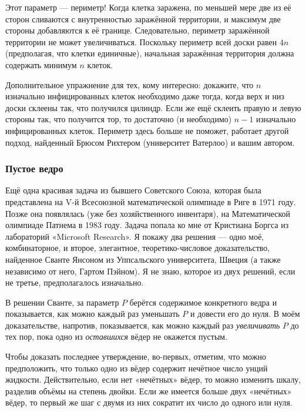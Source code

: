 Этот параметр --- периметр!
Когда клетка заражена, по меньшей мере две из её сторон сливаются с внутренностью заражённой территории, и максимум две стороны добавляются к её границе.
Следовательно, периметр заражённой территории не может увеличиваться.
Поскольку периметр всей доски равен $4n$ (предполагая, что клетки единичные), начальная заражённая территория должна содержать минимум $n$ клеток.
\heart

Дополнительное упражнение для тех, кому интересно: докажите, что $n$ изначально инфицированных клеток необходимо даже тогда, когда верх и низ доски склеены так, что получился цилиндр.
Если же ещё склеить правую и левую стороны так, что получится тор, то достаточно (и необходимо) $n-1$ изначально инфицированных клеток.
Периметр здесь больше не поможет,
работает другой подход, найденный Брюсом Рихтером (университет Ватерлоо) %
и вашим автором.

\subsubsection*{Пустое ведро}%

Ещё одна красивая задача из бывшего Советского Союза, которая была представлена на V-й Всесоюзной математической олимпиаде в Риге в 1971 году.
Позже она появлялась (уже без хозяйственного инвентаря), на Математической олимпиаде Патнема в 1983 году.
Задача попала ко мне от Кристиана Боргса из лабораторий «Microsoft Research». %
Я покажу два решения --- одно моё, комбинаторное, и второе, элегантное, теоретико-числовое доказательство, найденное Сванте Янсоном из Уппсальского университета, Швеция %
(а также независимо от него, Гартом Пэйном). %
Я не знаю, которое из двух решений, если не третье, предполагалось изначально.

\medskip

В решении Сванте, за параметр $P$ берётся содержимое конкретного ведра и показывается, как можно каждый раз уменьшать $P$ и довести его до нуля.
В моём доказательстве, напротив, показывается, как можно каждый раз \emph{увеличивать} $P$ до тех пор, пока одно из \emph{оставшихся} вёдер не окажется пустым.

Чтобы доказать последнее утверждение, во-первых, отметим, что можно предположить, что только одно из вёдер содержит нечётное число унций жидкости.
Действительно, если нет «нечётных» вёдер, то можно изменить шкалу, разделив объёмы на степень двойки.
Если же имеется больше двух «нечётных» вёдер, то первый же шаг с двумя из них сократит их число до одного или нуля.

